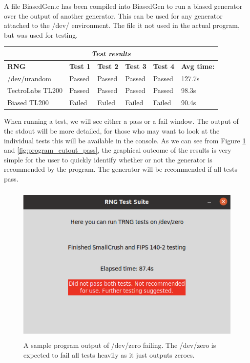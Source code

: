 \documentclass[]{final_report}
\begin{document}
\par{A file BiasedGen.c has been compiled into BiasedGen to run a biased generator over the output of another generator. This can be used for any generator attached to the /dev/ environment. The file it not used in the actual program, but was used for testing.}

\begin{tabular}{ |p{3cm}||p{1.5cm}|p{1.5cm}|p{1.5cm}|p{1.5cm}|p{2cm}| }
 \hline
 \multicolumn{6}{|c|}{\textbf{\textit{Test results}}} \\
 \hline
 \textbf{RNG}& \textbf{Test 1} & \textbf{Test 2} & \textbf{Test 3} & \textbf{Test 4} & \textbf{Avg time:}\\
 \hline
 /dev/urandom  & Passed & Passed & Passed & Passed & 127.7s\\ 
 \hline
 TectroLabs TL200 & Passed & Passed & Passed & Passed & 98.3s\\
 \hline
 Biased TL200 & Failed & Failed & Failed & Failed & 90.4s\\
 \hline
\end{tabular}

\par{When running a test, we will see either a pass or a fail window. The output of the stdout will be more detailed, for those who may want to look at the individual tests this will be available in the console. As we can see from Figure \ref{fig:program_cutout_fail} and \ref{fig:program_cutout_pass}, the graphical outcome of the results is very simple for the user to quickly identify whether or not the generator is recommended by the program. The generator will be recommended if all tests pass.}

\begin{figure}[h!]
\begin{center}
\includegraphics[height=8cm]{program_cutout_fail}
\caption{A sample program output of /dev/zero failing. The /dev/zero is expected to fail all tests heavily as it just outputs zeroes.}
\label{fig:program_cutout_fail}
\end{center}
\end{figure}
\end{document}
